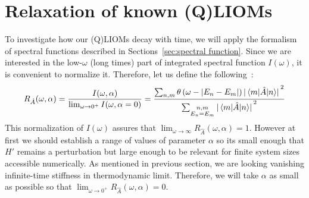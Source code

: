 \section{Relaxation of known (Q)LIOMs}
To investigate how our (Q)LIOMs decay with time, we will apply the formalism of spectral functions
described in Sections~\ref{sec:spectral function}.
Since we are interested in the low-\(\omega\) (long times) part of integrated spectral function
\(I(\omega)\), it is convenient to normalize it. Therefore, let us define the
following~\autocite{Mierzejewski2015Approx}:
\begin{equation}
  R_{\hat{A}}(\omega,\alpha) = \frac{I(\omega,\alpha)}{\lim_{\omega \to 0^{+}} I(\omega,\alpha=0)} = 
  \frac{\sum_{n,m}\theta\left(\omega -\abs{E_n-E_m}\right) \abs*{\matrixel{m}{\hat{A}}{n}}^2}
  {\sum_{\substack{n,m \\ E_n=E_m}} \abs*{\matrixel{m}{\hat{A}}{n}}^2}
  \label{eq:normalized integrated spectral function}
\end{equation}
This normalization of \(I(\omega)\) assures that  \(\lim_{\omega\to \infty} R_{\hat{A}}
(\omega,\alpha) = 1\). However at first we should establish a range of values of
parameter \(\alpha\) so its small enough that \(H'\) remains a perturbation but large enough
to be relevant for finite system sizes accessible numerically. As mentioned in previous section,
we are looking vanishing infinite-time stiffness in thermodynamic limit. Therefore, we will
take \(\alpha\) as small as possible so that  \(\lim_{\omega\to 0^{+}} R_{\hat{A}}
(\omega,\alpha) = 0\).

